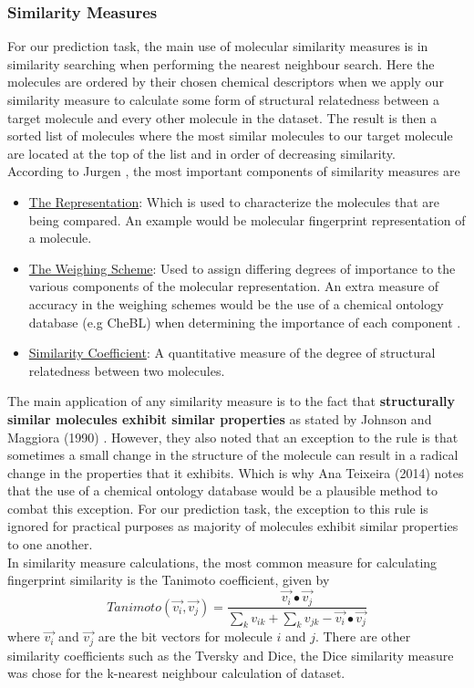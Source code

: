 \documentclass[a4paper,12pt]{report}
\begin{document}
			\subsubsection{Similarity Measures} 
			\label{subsubsection_similarity_measures}
			For our prediction task, the main use of molecular similarity measures is in similarity searching when performing the nearest neighbour search. Here the molecules are ordered by their chosen chemical descriptors when we apply our similarity measure to calculate some form of structural relatedness between a target molecule and every other molecule in the dataset. The result is then a sorted list of molecules where the most similar molecules to our target molecule are located at the top of the list and in order of decreasing similarity.\\
			According to Jurgen \cite{Jurgen2004}, the most important components of similarity measures are
				\begin{itemize}
					\item \underline{The Representation}: Which is used to characterize the molecules that are being compared. An example would be molecular fingerprint representation of a molecule.
					\item \underline{The Weighing Scheme}: Used to assign differing degrees of importance to the various components of the molecular representation. An extra measure of accuracy in the weighing schemes would be the use of a chemical ontology database (e.g CheBL) when determining the importance of each component \cite{AnaPhd2014}.
					\item \underline{Similarity Coefficient}: A quantitative measure of the degree of structural relatedness between two molecules.
				\end{itemize}
			The main application of any similarity measure is to the fact that \textbf{structurally similar molecules exhibit similar properties} as stated by Johnson and Maggiora (1990) \cite{JohnMaggiora1990}. However, they also noted that an exception to the rule is that sometimes a small change in the structure of the molecule can result in a radical change in the properties that it exhibits. Which is why Ana Teixeira (2014) \cite{AnaPhd2014} notes that the use of a chemical ontology database would be a plausible method to combat this exception. For our prediction task, the exception to this rule is ignored for practical purposes as majority of molecules exhibit similar properties to one another.\\
			In similarity measure calculations, the most common measure for calculating fingerprint similarity is the Tanimoto coefficient, given by 
				\begin{equation}
				Tanimoto(\vec{v_i}, \vec{v_j}) = 
				\frac{\vec{v_i}\bullet\vec{v_j}}
				{\sum_{k}v_{ik} + \sum_{k}v_{jk} - \vec{v_i}\bullet\vec{v_j}  } 
				\end{equation}
			where $\vec{v_i}$ and $\vec{v_j}$ are the bit vectors for molecule $i$ and $j$. There are other similarity coefficients such as the Tversky and Dice, the Dice similarity measure was chose for the k-nearest neighbour calculation of dataset.
	
\end{document}
